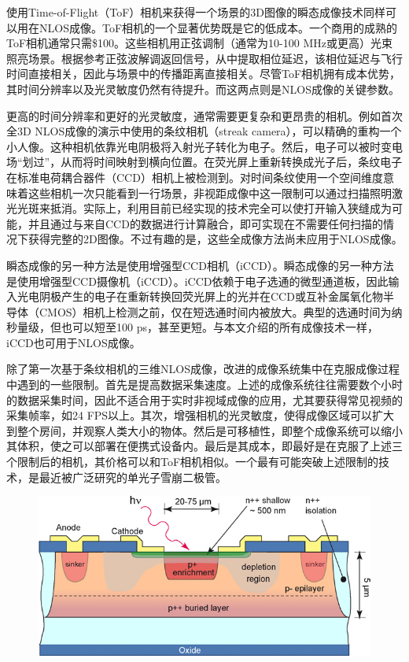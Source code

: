 \documentclass[master]{shtthesis}             %
\begin{document}
使用Time-of-Flight（ToF）相机来获得一个场景的3D图像的瞬态成像技术同样可以用在NLOS成像\citep{kadambi2013coded,kadambi2013coded,peters2015solving}。ToF相机的一个显著优势既是它的低成本。一个商用的成熟的ToF相机通常只需\$100。这些相机用正弦调制（通常为10-100 MHz或更高）光束照亮场景。根据参考正弦波解调返回信号，从中提取相位延迟，该相位延迟与飞行时间直接相关，因此与场景中的传播距离直接相关\citep{jarabo2017recent}。尽管ToF相机拥有成本优势，其时间分辨率以及光灵敏度仍然有待提升。而这两点则是NLOS成像的关键参数。

更高的时间分辨率和更好的光灵敏度，通常需要更复杂和更昂贵的相机。例如首次全3D NLOS成像的演示中使用的条纹相机（streak camera），可以精确的重构一个小人像\citep{Velten2012}。这种相机依靠光电阴极将入射光子转化为电子。然后，电子可以被时变电场“划过”，从而将时间映射到横向位置。在荧光屏上重新转换成光子后，条纹电子在标准电荷耦合器件（CCD）相机上被检测到。对时间条纹使用一个空间维度意味着这些相机一次只能看到一行场景，非视距成像中这一限制可以通过扫描照明激光光斑来抵消\citep{velten2013femto}。实际上，利用目前已经实现的技术完全可以使打开输入狭缝成为可能，并且通过与来自CCD的数据进行计算融合，即可实现在不需要任何扫描的情况下获得完整的2D图像\citep{gao2014single,mikami2016ultrafast,zhu2016space}。不过有趣的是，这些全成像方法尚未应用于NLOS成像。

瞬态成像的另一种方法是使用增强型CCD相机（iCCD）。瞬态成像的另一种方法是使用增强型CCD摄像机（iCCD）。iCCD依赖于电子选通的微型通道板，因此输入光电阴极产生的电子在重新转换回荧光屏上的光并在CCD或互补金属氧化物半导体（CMOS）相机上检测之前，仅在短选通时间内被放大。典型的选通时间为纳秒量级，但也可以短至100 ps，甚至更短。与本文介绍的所有成像技术一样，iCCD也可用于NLOS成像\citep{laurenzis2014nonline}。

除了第一次基于条纹相机的三维NLOS成像，改进的成像系统集中在克服成像过程中遇到的一些限制。首先是提高数据采集速度。上述的成像系统往往需要数个小时的数据采集时间，因此不适合用于实时非视域成像的应用，尤其要获得常见视频的采集帧率，如24 FPS以上\citep{read2000restoration}。其次，增强相机的光灵敏度，使得成像区域可以扩大到整个房间，并观察人类大小的物体。然后是可移植性，即整个成像系统可以缩小其体积，使之可以部署在便携式设备内。最后是其成本，即最好是在克服了上述三个限制后的相机，其价格可以和ToF相机相似。一个最有可能突破上述限制的技术，是最近被广泛研究的单光子雪崩二极管。

\begin{figure}[!tb]
  \centering
  \includegraphics[width=\textwidth]{figure/spad_pixel_struct.jpg}
  \label{fig:spad_pixel}
\end{figure}
\end{document}
